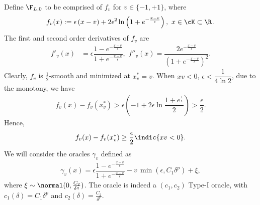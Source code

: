 Define $\F_{L,0}$ to be comprised of $f_v$ for $v \in \{-1,+1\}$, where
\begin{align*}
f_v(x) :=\epsilon\left( x-v\right)+2\epsilon^2 \ln\left(1+e^{-\frac{x-v}{\epsilon}}  \right), \,\, x \in \cK \subset \R\,.
\end{align*}
The first and second order derivatives of $f_v$ are
\begin{align*}
f'_v(x) &=\epsilon \dfrac{1-e^{-\frac{x-v}{\epsilon}}}{1+e^{-\frac{x-v}{\epsilon}}} ,\,\,
f''_v(x) = \dfrac{2e^{-\frac{x-v}{\epsilon}} }{\left(  1+e^{-\frac{x-v}{\epsilon}}\right)^2}  .
\end{align*}
Clearly, $f_v$ is $\frac{1}{2}$-smooth and minimized at $x^*_v = v$.
When $xv<0$, $\epsilon<\dfrac{1}{4\ln 2}$, due to the monotony, we have
\begin{align*}
f_v(x)-f_v(x_v^*) >\epsilon\left( -1 +2\epsilon \ln\dfrac{1+e^{\frac{1}{\epsilon}}}{2}  \right)> \dfrac{\epsilon}{2}.
\end{align*}
Hence,
\begin{align}
  f_v(x) - f_v(x^*_v)
  \ge \dfrac{\epsilon}{2}  \indic{x v  < 0}. \label{eq:main:fv-lb-main}
\end{align}
We will consider the oracles $\gamma_v$ defined as 
\begin{align}
 \gamma_v(x) = \epsilon \dfrac{1-e^{-\frac{x-v}{\epsilon}}}{1+e^{-\frac{x-v}{\epsilon}}} - v\, \min(\epsilon,C_1 \delta^p) + \xi, \label{eq:main:oracle-1d}
\end{align}
where $\xi \sim \normal(0,\frac{C_2}{\delta^q})$.
The oracle is indeed a $(c_1,c_2)$ Type-I oracle, with $c_1(\delta)=C_1\delta^p$ and $c_2(\delta)=\frac{C_2}{\delta^q}$.

